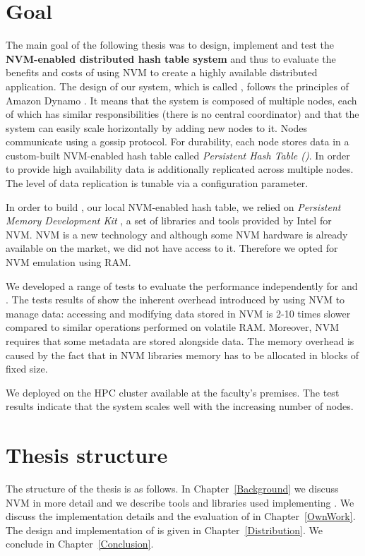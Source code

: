 \section{Goal}

The main goal of the following thesis was to design, implement and test the \textbf{NVM-enabled distributed hash table system} and thus to evaluate the benefits and costs of using NVM to create a highly available distributed application. 
The design of our system, which is called \DHTS, follows the principles of Amazon Dynamo \cite{AmazonDynamo}. It means that the system is composed of multiple nodes, each of which has similar responsibilities (there is no central coordinator) and that the system can easily scale horizontally by adding new nodes to it. Nodes communicate using a gossip protocol. For durability, each node stores data in a custom-built NVM-enabled hash table called \emph{Persistent Hash Table (\PHT)}. In order to provide high availability data is additionally replicated across multiple nodes. The level of data replication is tunable via a configuration parameter.

In order to build \PHT, our local NVM-enabled hash table, we relied on \emph{Persistent Memory Development Kit} \cite{PmemIo}, a set of libraries and tools provided by Intel for NVM. NVM is a new technology and although some NVM hardware is already available on the market, we did not have access to it. Therefore we opted for NVM emulation using RAM.

We developed a range of tests to evaluate the performance independently for \PHT and \DHTS. The tests results of \PHT show the inherent overhead introduced by using NVM to manage data: accessing and modifying data stored in NVM is 2-10 times slower compared to similar operations performed on volatile RAM. Moreover, NVM requires that some metadata are stored alongside data. The memory overhead is caused by the fact that in NVM libraries memory has to be allocated in blocks of fixed size. 

We deployed \DHTS on the HPC cluster available at the faculty's premises. The test results indicate that the system scales well with the increasing number of nodes.

\section{Thesis structure}

The structure of the thesis is as follows. In Chapter~\ref{Background} we discuss NVM in more detail and we describe tools and libraries used implementing \DHTS. We discuss the implementation details and the evaluation of \PHT in Chapter~\ref{OwnWork}. The design and implementation of \DHTS is given in Chapter~\ref{Distribution}. We conclude in Chapter~\ref{Conclusion}.

